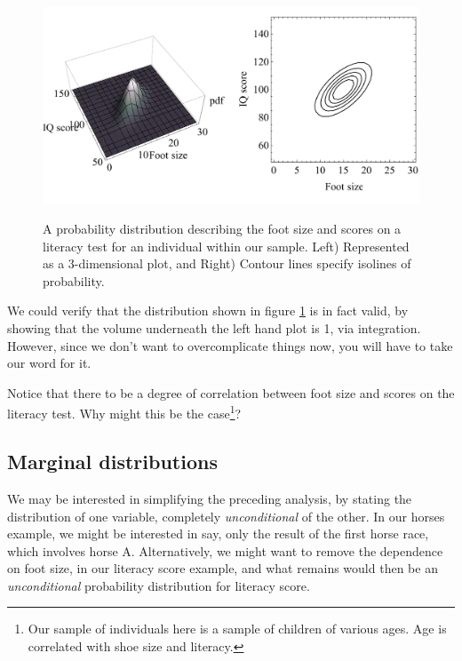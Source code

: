 \documentclass[11pt,fullpage]{book}
\begin{document}
\begin{figure}
\centering
\scalebox{0.5} 
{\includegraphics{Probability_footSizeIntelligenceTwoDimensionalExample.pdf}}
\caption{A probability distribution describing the foot size and scores on a literacy test for an individual within our sample. Left) Represented as a 3-dimensional plot, and Right) Contour lines specify isolines of probability.}\label{fig:Probability_footSizeIntelligenceTwoDimensionalExample}
\end{figure}

We could verify that the distribution shown in figure \ref{fig:Probability_footSizeIntelligenceTwoDimensionalExample} is in fact valid, by showing that the volume underneath the left hand plot is 1, via integration. However, since we don't want to overcomplicate things now, you will have to take our word for it.

Notice that there to be a degree of correlation between foot size and scores on the literacy test. Why might this be the case\footnote{Our sample of individuals here is a sample of children of various ages. Age is correlated with shoe size and literacy.}?

\subsection{Marginal distributions}\label{sec:Probability_marginal}
We may be interested in simplifying the preceding analysis, by stating the distribution of one variable, completely \textit{unconditional} of the other. In our horses example, we might be interested in say, only the result of the first horse race, which involves horse A. Alternatively, we might want to remove the dependence on foot size, in our literacy score example, and what remains would then be an \textit{unconditional} probability distribution for literacy score.
\end{document}
